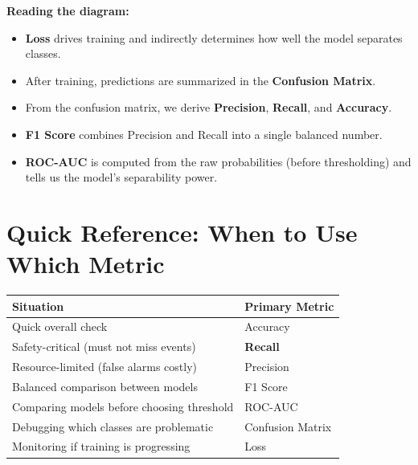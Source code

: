\documentclass[11pt]{article}
\begin{document}
\noindent \textbf{Reading the diagram:}
\begin{itemize}[noitemsep]
    \item \textbf{Loss} drives training and indirectly determines how well the model separates classes.
    \item After training, predictions are summarized in the \textbf{Confusion Matrix}.
    \item From the confusion matrix, we derive \textbf{Precision}, \textbf{Recall}, and \textbf{Accuracy}.
    \item \textbf{F1 Score} combines Precision and Recall into a single balanced number.
    \item \textbf{ROC-AUC} is computed from the raw probabilities (before thresholding) and tells us the model's separability power.
\end{itemize}

\section{Quick Reference: When to Use Which Metric}

\begin{center}
\renewcommand{\arraystretch}{1.3}
\begin{tabularx}{\textwidth}{@{}lX@{}}
\toprule
\textbf{Situation} & \textbf{Primary Metric} \\
\midrule
Quick overall check                    & Accuracy \\
Safety-critical (must not miss events) & \textbf{Recall} \\
Resource-limited (false alarms costly) & Precision \\
Balanced comparison between models     & F1 Score \\
Comparing models before choosing threshold & ROC-AUC \\
Debugging which classes are problematic & Confusion Matrix \\
Monitoring if training is progressing  & Loss \\
\bottomrule
\end{tabularx}
\end{center}
\end{document}

